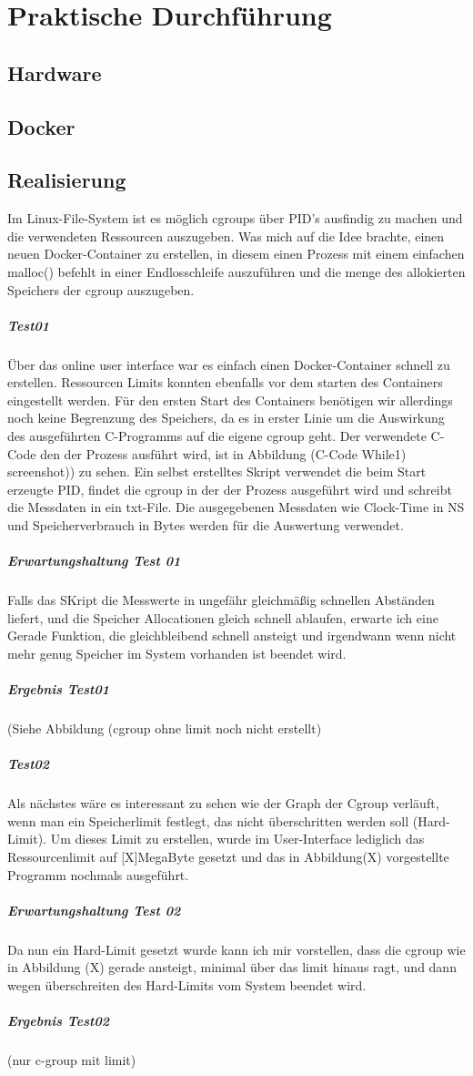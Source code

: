 \thispagestyle{empty}
\section{Praktische Durchführung}
\subsection{Hardware}
\subsection{Docker}
\subsection{Realisierung}
Im Linux-File-System ist es möglich cgroups über PID's ausfindig zu machen und die verwendeten Ressourcen auszugeben. Was mich auf die Idee brachte, einen neuen Docker-Container zu erstellen, in diesem einen Prozess mit einem einfachen malloc() befehlt in einer Endlosschleife auszuführen und die menge des allokierten Speichers der cgroup auszugeben. 

\subparagraph{Test01}
Über das online user interface war es einfach einen Docker-Container schnell zu erstellen. Ressourcen Limits konnten ebenfalls vor dem starten des Containers eingestellt werden. Für den ersten Start des Containers benötigen wir allerdings noch keine Begrenzung des Speichers, da es in erster Linie um die Auswirkung des ausgeführten C-Programms auf die eigene cgroup geht. Der verwendete C-Code den der Prozess ausführt wird, ist in Abbildung (C-Code While1) screenshot)) zu sehen. Ein selbst erstelltes Skript verwendet die beim Start erzeugte PID, findet die cgroup in der der Prozess ausgeführt wird und schreibt die Messdaten in ein txt-File. Die ausgegebenen Messdaten wie Clock-Time in NS und Speicherverbrauch in Bytes werden für die Auswertung verwendet.

\subparagraph{Erwartungshaltung Test 01}
Falls das SKript die Messwerte in ungefähr gleichmäßig schnellen Abständen liefert, und die Speicher Allocationen gleich schnell ablaufen, erwarte ich eine Gerade Funktion, die gleichbleibend schnell ansteigt und irgendwann wenn nicht mehr genug Speicher im System vorhanden ist beendet wird.

\subparagraph{Ergebnis Test01}
(Siehe Abbildung (cgroup ohne limit noch nicht erstellt)

\subparagraph{Test02}
Als nächstes wäre es interessant zu sehen wie der Graph der Cgroup verläuft, wenn man ein Speicherlimit festlegt, das nicht überschritten werden soll (Hard-Limit). Um dieses Limit zu erstellen, wurde im User-Interface lediglich das Ressourcenlimit auf [X]MegaByte gesetzt und das in Abbildung(X) vorgestellte Programm nochmals ausgeführt.

\subparagraph{Erwartungshaltung Test 02}
Da nun ein Hard-Limit gesetzt wurde kann ich mir vorstellen, dass die cgroup wie in Abbildung (X) gerade ansteigt, minimal über das limit hinaus ragt, und dann wegen überschreiten des Hard-Limits vom System beendet wird.

\subparagraph{Ergebnis Test02}
(nur c-group mit limit)

\pagebreak